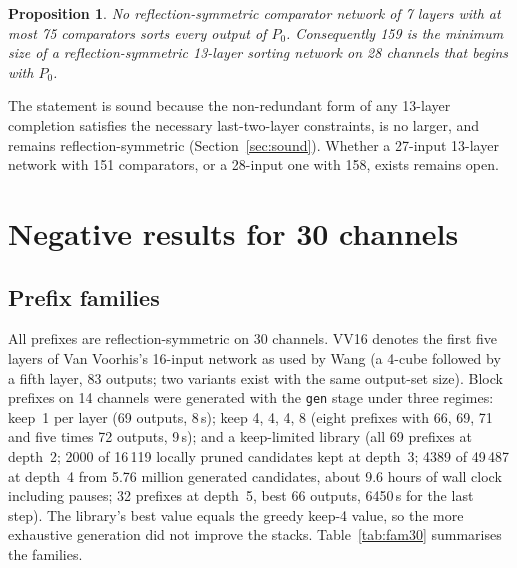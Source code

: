 \documentclass[11pt,a4paper]{article}
\theoremstyle{plain}
\newtheorem{proposition}{Proposition}
\theoremstyle{definition}
\theoremstyle{remark}
\begin{document}
\begin{proposition}\label{prop:159}
No reflection-symmetric comparator network of 7 layers with at most 75 comparators sorts every output of $P_0$. Consequently 159 is the minimum size of a reflection-symmetric 13-layer sorting network on 28 channels that begins with $P_0$.
\end{proposition}

The statement is sound because the non-redundant form of any 13-layer completion satisfies the necessary last-two-layer constraints, is no larger, and remains reflection-symmetric (Section~\ref{sec:sound}). Whether a 27-input 13-layer network with 151 comparators, or a 28-input one with 158, exists remains open.

\section{Negative results for 30 channels}\label{sec:n30}

\subsection{Prefix families}\label{sec:fam30}

All prefixes are reflection-symmetric on 30 channels. VV16 denotes the first five layers of Van Voorhis's 16-input network as used by Wang (a 4-cube followed by a fifth layer, 83 outputs; two variants exist with the same output-set size). Block prefixes on 14 channels were generated with the \texttt{gen} stage under three regimes: keep~1 per layer (69 outputs, 8\,s); keep 4, 4, 4, 8 (eight prefixes with 66, 69, 71 and five times 72 outputs, 9\,s); and a keep-limited library (all 69 prefixes at depth~2; 2000 of 16\,119 locally pruned candidates kept at depth~3; 4389 of 49\,487 at depth~4 from 5.76 million generated candidates, about 9.6 hours of wall clock including pauses; 32 prefixes at depth~5, best 66 outputs, 6450\,s for the last step). The library's best value equals the greedy keep-4 value, so the more exhaustive generation did not improve the stacks. Table~\ref{tab:fam30} summarises the families.
\end{document}

